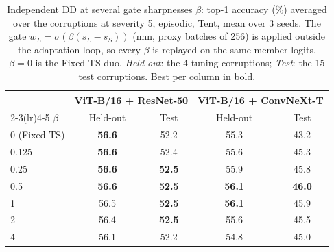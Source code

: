 \begin{table}[t]
    \centering
    \small
    \caption{Independent DD at several gate sharpnesses $\beta$: top-1 accuracy (\%) averaged over the corruptions at severity 5, episodic, Tent, mean over 3 seeds. The gate $w_L = \sigma(\beta(s_L - s_S))$ (nnn, proxy batches of 256) is applied outside the adaptation loop, so every $\beta$ is replayed on the same member logits. $\beta = 0$ is the Fixed TS duo. \emph{Held-out}: the 4 tuning corruptions; \emph{Test}: the 15 test corruptions. Best per column in bold.}
    \label{tab:indep_dd_beta_sweep}
    \begin{tabular}{lcccc}
        \toprule
        & \multicolumn{2}{c}{ViT-B/16 + ResNet-50} & \multicolumn{2}{c}{ViT-B/16 + ConvNeXt-T} \\
        \cmidrule(lr){2-3}\cmidrule(lr){4-5}
        $\beta$ & Held-out & Test & Held-out & Test \\
        \midrule
        0 (Fixed TS) & \textbf{56.6} & 52.2 & 55.3 & 43.2 \\
        0.125 & \textbf{56.6} & 52.4 & 55.6 & 45.3 \\
        0.25 & \textbf{56.6} & \textbf{52.5} & 55.9 & 45.8 \\
        0.5 & \textbf{56.6} & \textbf{52.5} & \textbf{56.1} & \textbf{46.0} \\
        1 & 56.5 & \textbf{52.5} & \textbf{56.1} & 45.9 \\
        2 & 56.4 & \textbf{52.5} & 55.6 & 45.5 \\
        4 & 56.1 & 52.2 & 54.8 & 45.0 \\
        \bottomrule
    \end{tabular}
\end{table}
